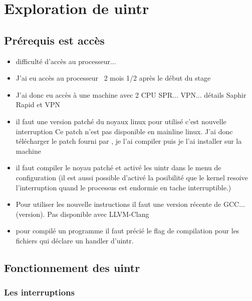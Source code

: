 \section{Exploration de uintr}

\subsection{Prérequis est accès}

\begin{itemize}
  \item difficulté d'accès au processeur...
  \item J'ai eu accès au processeur ~2 mois 1/2 après le début du stage
  \item J'ai donc eu accès à une machine avec 2 CPU SPR... VPN... détails Saphir Rapid et VPN
  \item il faut une version patché du noyaux linux pour utilisé c'est nouvelle interruption
  Ce patch n'est pas disponible en mainline linux.
  J'ai donc télécharger le patch fourni par \intel{}, je l'ai compiler puis je l'ai installer sur la machine
  \item il faut compiler le noyau patché et activé les uintr dans le menu de configuration (il est aussi possible d'activé la posibilité que le kernel resoive l'interruption quand le processus est endormie en tache interruptible.)
  \item Pour utiliser les nouvelle instructions il faut une version récente de GCC... (version).
  Pas disponible avec LLVM-Clang
  \item pour compilé un programme il faut précié le flag de compilation  pour les fichiers qui déclare un handler d'uintr.
\end{itemize}

\subsection{Fonctionnement des uintr}

\subsubsection{Les interruptions}

